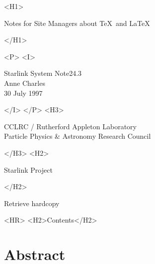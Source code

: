 \documentclass[11pt,twoside]{article}
\newcommand{\stardoccategory}  {Starlink System Note}
\newcommand{\stardocsource}    {ssn\stardocnumber}
\newcommand{\stardocnumber}    {24.3}
\newcommand{\stardocauthors}   {Anne Charles}
\newcommand{\stardocdate}      {30 July 1997}
\newcommand{\stardoctitle}     {Notes for Site Managers about \TeX\ and \LaTeX}
\newcommand{\htmladdnormallink}[2]{#1}
\newcommand{\htmladdimg}[1]{}
\newcommand{\htmlref}[2]{#1}
\newcommand{\htmladdtonavigation}[1]{}
\newcommand{\xlabel}[1]{}
\newcommand{\latexonlytoc}[0]{\tableofcontents}
\begin{document}
\begin{htmlonly}
   \xlabel{}
   \begin{rawhtml} <H1> \end{rawhtml}
      \stardoctitle
   \begin{rawhtml} </H1> \end{rawhtml}


   \begin{rawhtml} <P> <I> \end{rawhtml}
   \stardoccategory \stardocnumber \\
   \stardocauthors \\
   \stardocdate
   \begin{rawhtml} </I> </P> <H3> \end{rawhtml}
      \htmladdnormallink{CCLRC}{http://www.cclrc.ac.uk} /
      \htmladdnormallink{Rutherford Appleton Laboratory}
                        {http://www.cclrc.ac.uk/ral} \\
      \htmladdnormallink{Particle Physics \& Astronomy Research Council}
                        {http://www.pparc.ac.uk} \\
   \begin{rawhtml} </H3> <H2> \end{rawhtml}
      \htmladdnormallink{Starlink Project}{http://star-www.rl.ac.uk/}
   \begin{rawhtml} </H2> \end{rawhtml}
   \htmladdnormallink{\htmladdimg{source.gif} Retrieve hardcopy}
      {http://star-www.rl.ac.uk/cgi-bin/hcserver?\stardocsource}\\

  \label{stardoccontents}
  \begin{rawhtml} 
    <HR>
    <H2>Contents</H2>
  \end{rawhtml}
  \renewcommand{\latexonlytoc}[0]{}
  \htmladdtonavigation{\htmlref{\htmladdimg{contents_motif.gif}}
        {stardoccontents}}

  \section{\xlabel{abstract}Abstract}

\end{htmlonly}
\end{document}
